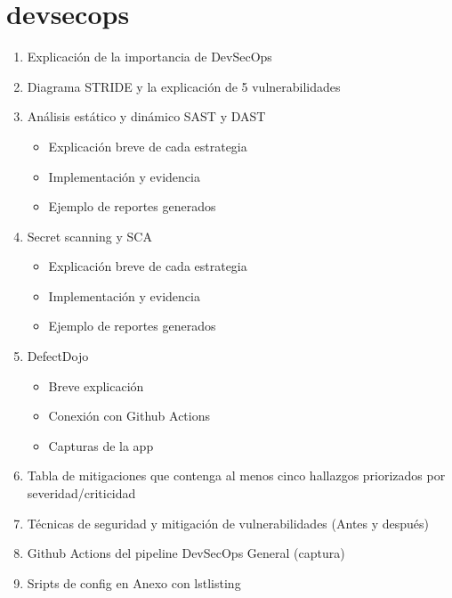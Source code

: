 \section{devsecops}

\begin{enumerate}
    \item Explicación de la importancia de DevSecOps

    \item Diagrama STRIDE y la explicación de 5 vulnerabilidades

    \item Análisis estático y dinámico SAST y DAST

          \begin{itemize}
              \item Explicación breve de cada estrategia
              \item Implementación y evidencia
              \item Ejemplo de reportes generados
          \end{itemize}

    \item Secret scanning y SCA
          \begin{itemize}
              \item Explicación breve de cada estrategia
              \item Implementación y evidencia
              \item Ejemplo de reportes generados
          \end{itemize}

    \item DefectDojo
          \begin{itemize}
              \item Breve explicación
              \item Conexión con Github Actions
              \item Capturas de la app
          \end{itemize}

    \item Tabla de mitigaciones que contenga al menos cinco hallazgos priorizados por
          severidad/criticidad

    \item Técnicas de seguridad y mitigación de vulnerabilidades (Antes y después)

    \item Github Actions del pipeline DevSecOps General (captura)
    \item Sripts de config en Anexo con lstlisting

\end{enumerate}

